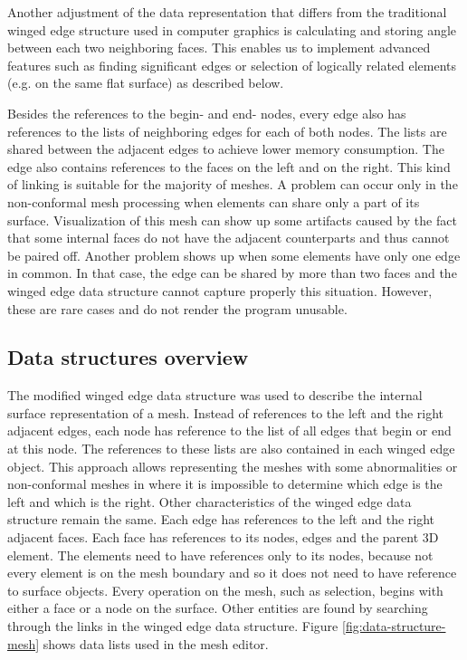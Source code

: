 Another adjustment of the data representation that differs from the traditional winged edge structure used in computer graphics is calculating and storing angle between each two neighboring faces. This enables us to implement advanced features such as finding significant edges or selection of logically related elements (e.g. on the same flat surface) as described below.

Besides the references to the begin- and end- nodes, every edge also has references to the lists of neighboring edges for each of both nodes. The lists are shared between the adjacent edges to achieve lower memory consumption. The edge also contains references to the faces on the left and on the right. This kind of linking is suitable for the majority of meshes. A problem can occur only in the non-conformal mesh processing when elements can share only a part of its surface. Visualization of this mesh can show up some artifacts caused by the fact that some internal faces do not have the adjacent counterparts and thus cannot be paired off. Another problem shows up when some elements have only one edge in common. In that case, the edge can be shared by more than two faces and the winged edge data structure cannot capture properly this situation. However, these are rare cases and do not render the program unusable.


\subsection{Data structures overview}

The modified winged edge data structure was used to describe the internal surface representation of a mesh. Instead of references to the left and the right adjacent edges, each node has reference to the list of all edges that begin or end at this node. The references to these lists are also contained in each winged edge object. This approach allows representing the meshes with some abnormalities or non-conformal meshes in where it is impossible to determine which edge is the left and which is the right. Other characteristics of the winged edge data structure remain the same. Each edge has references to the left and the right adjacent faces. Each face has references to its nodes, edges and the parent 3D element. The elements need to have references only to its nodes, because not every element is on the mesh boundary and so it does not need to have reference to surface objects. Every operation on the mesh, such as selection, begins with either a face or a node on the surface. Other entities are found by searching through the links in the winged edge data structure. Figure \ref{fig:data-structure-mesh} shows data lists used in the mesh editor.

